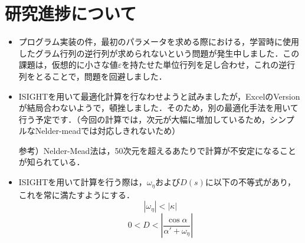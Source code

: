 \documentclass[11pt]{jsarticle}
\begin{document}
	\section{研究進捗について}
		\begin{itemize}
			\item プログラム実装の件，最初のパラメータを求める際における，学習時に使用したグラム行列の逆行列が求められないという問題が発生中しました．この課題は，仮想的に小さな値$ \varepsilon $を持たせた単位行列を足し合わせ，これの逆行列をとることで，問題を回避しました．
			\item ISIGHTを用いて最適化計算を行なわせようと試みましたが，ExcelのVersionが結局合わないようで，頓挫しました．そのため，別の最適化手法を用いて行う予定です．（今回の計算では，次元が大幅に増加しているため，シンプルなNelder-meadでは対応しきれないため）
			
			参考）Nelder-Mead法は，50次元を超えるあたりで計算が不安定になることが知られている．
			\item ISIGHTを用いて計算を行う際は，$ \omega_{\eta} $および$ D(s) $に以下の不等式があり，これを常に満たすようにする．
			\begin{equation}\label{eq:OmgEtaEq}
				|\omega_{\eta}|<|\kappa|
			\end{equation}
			\begin{equation}
				0<D<\left| \frac{\cos \alpha}{\alpha'+\omega_{\eta}} \right|
			\end{equation}
		\end{itemize}
	\newpage
\vspace{10cm}
	

\vspace{14cm}
	\articleSPRfour
	\articleSPRfive
\end{document}
